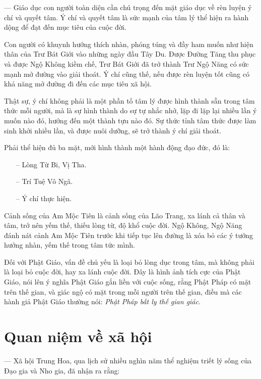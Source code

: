— Giáo dục con người toàn diện cần chú trọng đến mặt giáo dục về rèn luyện ý chí và quyết tâm. Ý chí và quyết tâm là sức mạnh của tâm lý thể hiện ra hành dộng để đạt đến mục tiêu của cuộc đời.

Con người có khuynh hướng thích nhàn, phóng túng và đầy ham muốn như hiện thân của Trư Bát Giới vào những ngày đầu Tây Du. Được Đường Tăng thu phục và được Ngộ Không kiềm chế, Trư Bát Giới đã trở thành Trư Ngộ Năng có sức mạnh mở đường vào giải thoát. Ý chí cũng thế, nếu được rèn luyện tốt cũng có khả năng mở đường đi đến các mục tiêu xã hội.

Thật sự, ý chí không phải là một phần tố tâm lý được hình thành sẵn trong tâm thức mỗi người, mà là sự hình thành do sự tự nhắc nhở, lặp đi lặp lại nhiều lần ý muốn nào đó, hướng đến một thành tựu nào đó. Sự thức tỉnh tâm thức được làm sinh khởi nhiều lần, và được nuôi dưỡng, sẽ trở thành ý chí giải thoát.

Phải thể hiện đủ ba mặt, mới hình thành một hành động đạo đức, đó là:

\begin{itemize}
    \item[–] Lòng Từ Bi, Vị Tha.
    \item[–] Trí Tuệ Vô Ngã.
    \item[–] Ý chí thực hiện.
\end{itemize}

Cảnh sống của Am Mộc Tiên là cảnh sống của Lão Trang, xa lánh cả thân và tâm, trở nên yếm thế, thiếu lòng từ, độ khổ cuộc đời. Ngộ Không, Ngộ Năng đánh nát cảnh Am Mộc Tiên trước khi tiếp tục lên đường là xóa bỏ các ý tưởng hưởng nhàn, yếm thế trong tâm tức mình.

Đối với Phật Giáo, vấn đề chủ yếu là loại bỏ lòng dục trong tâm, mà không phải là loại bỏ cuộc đời, hay xa lánh cuộc đời. Đây là hình ảnh tích cực của Phật Giáo, nói lên ý nghĩa Phật Giáo gắn liền với cuộc sống, rằng Phật Pháp có mặt trên thế gian, và giác ngộ có mặt trong mỗi người trên thế gian, điều mà các hành giả Phật Giáo thường nói: \emph{Phật Pháp bất ly thế gian giác}.

\section{Quan niệm về xã hội} %
\label{sec:64_xa_hoi}

— Xã hội Trung Hoa, qua lịch sử nhiều nghìn năm thể nghiệm triết lý sống của Đạo gia và Nho gia, đã nhận ra rằng:

